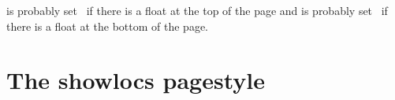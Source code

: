 \begin{lcode}
\newif\iffloatattop
  \floatattopfalse
\newif\iffloatatbot
  \floatatbotfalse

\renewcommand*{\@addtotoporbot}{%
  \@getfpsbit \tw@
  \ifodd \@tempcnta
    \@flsetnum \@topnum
    \ifnum \@topnum>\z@
      \@tempswafalse
      \@flcheckspace \@toproom \@toplist
      \if@tempswa
        \@bitor\@currtype{\@midlist\@botlist}%
        \if@test
        \else
          \@flupdates \@topnum \@toproom \@toplist
          \@inserttrue
  \global\floatattoptrue
        \fi
      \fi
    \fi
  \fi
  \if@insert
  \else
    \@addtobot
  \fi}

\renewcommand*{\@addtobot}{%
  \@getfpsbit 4\relax
  \ifodd \@tempcnta
    \@flsetnum \@botnum
    \ifnum \@botnum>\z@
      \@tempswafalse
      \@flcheckspace \@botroom \@botlist
      \if@tempswa
        \global \maxdepth \z@
        \@flupdates \@botnum \@botroom \@botlist
        \@inserttrue
  \global\floatatbottrue
      \fi
    \fi
  \fi}

\let\p@wold@output\@outputpage
\renewcommand*{\@outputpage}{%
  \p@wold@output
  \global\floatattopfalse
  \global\floatatbotfalse}

\endinput
\end{lcode}
 is probably set \ptrue\ if there is a float at the 
top of the page and
 is probably set \ptrue\ if there is a float at the bottom
of the page.



\section{The showlocs pagestyle}

